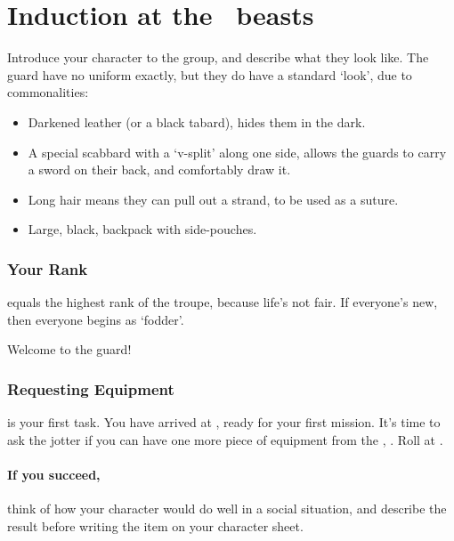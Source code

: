 \section[Induction at the \Glsfmttext{templeOfBeasts}]{Induction at the ~\gls{beasts}}
\label{ngIntroductions}

\begin{multicols}{2}

\noindent
Introduce your character to the group, and describe what they look like.
The \gls{guard} have no uniform exactly, but they do have a standard `look', due to commonalities:

\begin{itemize}
  \item
  Darkened leather (or a black tabard), hides them in the dark.
  \item
  A special scabbard with a `v-split' along one side, allows the \glspl{guard} to carry a sword on their back, and comfortably draw it.
  \item
  Long hair means they can pull out a strand, to be used as a suture.
  \item
  Large, black, backpack with side-pouches.
\end{itemize}

\subsubsection{Your Rank}
\label{ngRank}
equals the highest rank of the troupe, because life's not fair.
If everyone's new, then everyone begins as `fodder'.

Welcome to the \gls{guard}!

\subsubsection{Requesting Equipment}
is your first task.
You have arrived at , ready for your first mission.
It's time to ask the \gls{jotter} if you can have one more piece of equipment from the , .
Roll  at \tn[7].

\paragraph{If you succeed,}
think of how your character would do well in a social situation, and describe the result before writing the item on your character sheet.


\end{multicols}
